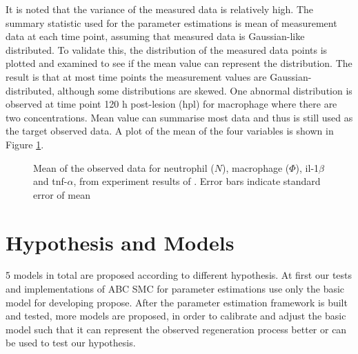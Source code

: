 \documentclass[12pt,a4paper]{report}
\begin{document}
It is noted that the variance of the measured data is relatively high. The summary statistic used for the parameter estimations is mean of measurement data at each time point, assuming that measured data is Gaussian-like distributed. To validate this, the distribution of the measured data points is plotted and examined to see if the mean value can represent the distribution. The result is that at most time points the measurement values are Gaussian-distributed, although some distributions are skewed. One abnormal distribution is observed at time point 120 h post-lesion (hpl) for macrophage where there are two concentrations. Mean value can summarise most data and thus is still used as the target observed data. A plot of the mean of the four variables is shown in Figure \ref{fig:obs_data}.

\begin{figure}
\begin{center}
\end{center}

\caption[Mean of the observed data]%
{Mean of the observed data for neutrophil ($N$), macrophage ($\Phi$), il-1$\beta$ and tnf-$\alpha$, from experiment results of \cite{ref:Tsarouchas}. Error bars indicate standard error of mean} 
\label{fig:obs_data}

\end{figure}

\section{Hypothesis and Models}

5 models in total are proposed according to different hypothesis. At first our tests and implementations of ABC SMC for parameter estimations use only the basic model for developing propose. After the parameter estimation framework is built and tested, more models are proposed, in order to calibrate and adjust the basic model such that it can represent the observed regeneration process better or can be used to test our hypothesis. 
\end{document}

